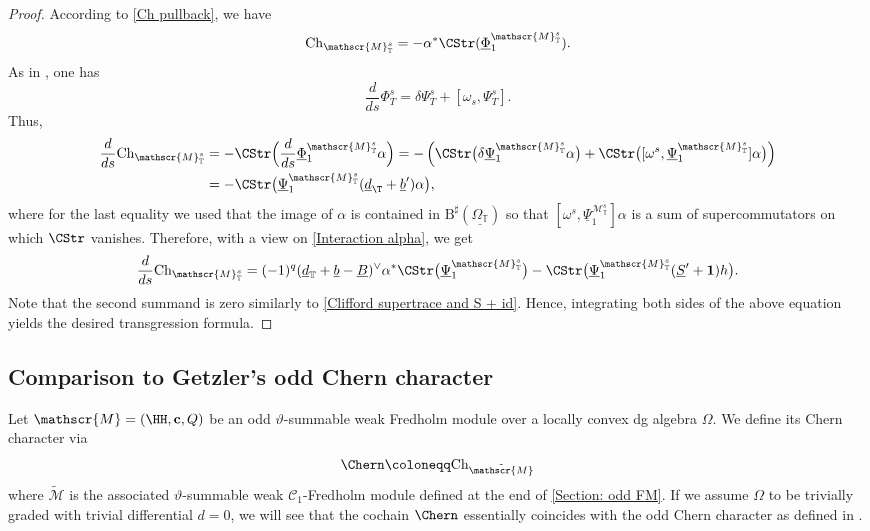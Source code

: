 \documentclass[a4paper, english, 12pt, bibliography=totocnumbered,
index=totoc]{scrartcl}
\begin{document}
\begin{proof}
	According to \cref{Ch pullback}, we have
	\begin{equation*}
		\mathrm{Ch}_{\mathscr{M}^s_{\mathbb{T}}} = -\alpha^*
		\CStr(\underline{\Phi}_1^{\mathscr{M}^s_{\mathbb{T}}}).
	\end{equation*}
	As in \cite[Proposition 6.4]{GüneysuLudewig}, one has
	\begin{equation}\label{Bianchi psi}
		\dfrac{d}{ds} \Phi_T^s = \delta \Psi_T^s + [\omega_s, \Psi_T^s].
	\end{equation}
	Thus,
	\begin{align*}
		\frac{d}{ds}\mathrm{Ch}_{\mathscr{M}^s_{\mathbb{T}}} & = -
		\CStr\Big(\frac{d}{ds}
		\underline{\Phi}_1^{\mathscr{M}_{\mathbb{T}}^s} \alpha\Big) = -
		\left(\CStr\big(\delta \underline{\Psi}_1^{\mathscr{M}_{\mathbb{T}}^s}
		\alpha\big) + \CStr\big([\omega^s,
		\underline{\Psi}_1^{\mathscr{M}_{\mathbb{T}}^s}]\alpha\big)\right) \\
		& = - \CStr
		\big(\underline{\Psi}_1^{\mathscr{M}_{\mathbb{T}}^s}(\underline{d}_\T
		+
		\underline{b}')\alpha\big),
	\end{align*}
	where for the last equality we used that the image of $\alpha$ is
	contained in
	$\mathrm{B}^{\sharp}(\underline{\Omega_{\mathbb{T}}})$ so that $[\omega^s,
	\underline{\Psi}_1^{\mathscr{M}_{\mathbb{T}}^s}]\alpha$
	is a sum of supercommutators on which $\CStr$ vanishes.
	Therefore, with a view on \cref{Interaction alpha}, we get
	\begin{equation*}
		\frac{d}{ds}\mathrm{Ch}_{\mathscr{M}^s_{\mathbb{T}}} = (-1)^{q}
		(\underline{d}_{\mathbb{T}} + \underline{b} - \underline{B})^{\vee}
		\alpha^*\CStr\big(\underline{\Psi}_1^{\mathscr{M}_{\mathbb{T}}^s}\big)
		- \CStr\big(\underline{\Psi}_1^{\mathscr{M}_{\mathbb{T}}^s}
		(\underline{S}' + \mathbf{1})h\big).
	\end{equation*}
	Note that the second summand is zero similarly to \cref{Clifford 
	supertrace and S + id}.
	Hence, integrating both sides of the above equation yields the desired
	transgression formula.
\end{proof}
\subsection{Comparison to Getzler's odd Chern character}
Let $\mathscr{M} = (\HH, \mathbf{c}, Q)$ be an odd $\vartheta$-summable weak
Fredholm module over a locally convex dg algebra $\Omega$.
We define its Chern character via
\begin{equation*}
	\Chern \coloneqq \mathrm{Ch}_{\tilde{\mathscr{M}}}
\end{equation*}
where $\tilde{\mathscr{M}}$ is the associated $\vartheta$-summable weak
$\mathcal{C}_1$-Fredholm module defined at the end of \cref{Section: odd FM}.
If we assume $\Omega$ to be trivially graded with trivial differential $d =
0$, we will see that the cochain $\Chern$ essentially coincides
with the odd Chern character as defined in \cite[Definition 4.1]{GetzlerOdd}.
\end{document}
